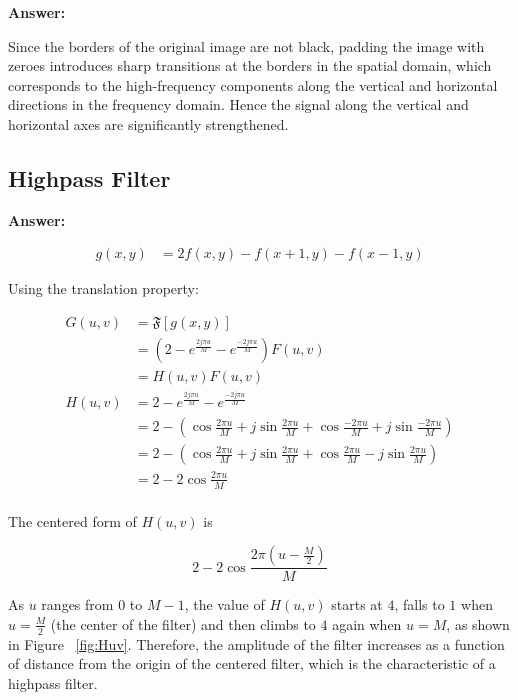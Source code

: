 \documentclass{article}
\begin{document}
\textbf{Answer:}

Since the borders of the original image are not black, padding the image with zeroes introduces sharp transitions at the borders in the spatial domain, which corresponds to the high-frequency components along the vertical and horizontal directions in the frequency domain. Hence the signal along the vertical and horizontal axes are significantly strengthened.

\subsection{Highpass Filter}

\textbf{Answer:}

\begin{align*} 
g(x, y) &
= 2 f(x, y) - f(x+1, y) - f(x-1, y)
\end{align*}

Using the translation property:

\begin{align*} 
G(u, v) & = \mathfrak{F}[g(x, y)] \\
& = (2 - e^{\frac{2j\pi u}{M}} - e^{\frac{-2j\pi u}{M}})F(u, v)\\
& = H(u, v) F(u, v) \\
H(u, v) & = 2 - e^{\frac{2j\pi u}{M}} - e^{\frac{-2j\pi u}{M}} \\
& = 2 - (\cos{\frac{2\pi u}{M}} + j\sin{\frac{2\pi u}{M}} + \cos{\frac{-2\pi u}{M}} + j\sin{\frac{-2\pi u}{M}}) \\
& = 2 - (\cos{\frac{2\pi u}{M}} + j\sin{\frac{2\pi u}{M}} + \cos{\frac{2\pi u}{M}} - j\sin{\frac{2\pi u}{M}}) \\
& = 2 - 2\cos{\frac{2\pi u}{M}} \\
\end{align*}

The centered form of $H(u, v)$ is

$$
2 - 2\cos{\frac{2\pi (u -\frac{M}{2})}{M}}
$$

As $u$ ranges from $0$ to $M − 1$, the value of
$H(u, v)$ starts at $4$, falls to $1$ when $u = \frac{M}{2}$ (the center of
the filter) and then climbs to $4$ again when $u = M$, as shown in Figure ~\ref{fig:Huv}. Therefore, the amplitude of the filter increases as a function of distance from the origin of the centered filter, which is the characteristic of a highpass filter.
\end{document}
